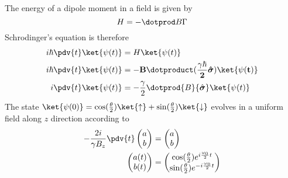 \documentclass[12pt]{article}
\begin{document}
        \section{}
        \subsection{} The energy of a dipole moment in a field is given by \[
            H = - \dotprod B \Gamma 
        \]
        Schrodinger's equation is therefore \begin{align*}
            i\hbar\pdv{t} \ket{\psi(t)} &= H \ket{\psi(t)}\\
            i\hbar\pdv{t} \ket{\psi(t)} &= - \bf B \dotproduct (\frac{\gamma\hbar}{2} \hat{\boldsymbol \sigma}) \ket{\psi(t)}\\
            i\pdv{t} \ket{\psi(t)} &= - \frac{\gamma}{2} \dotprod{B}{\hat{\boldsymbol \sigma}}\ket{\psi(t)}
        \end{align*}
        The state \(\ket{\psi(0)} = \cos(\frac{\theta}{2})\ket{\uparrow} + \sin(\frac{\theta}{2})\ket{\downarrow} \) evolves in a uniform field along \(z\) direction according to \begin{align*}
            - \frac{2i}{\gamma B_z} \pdv{t} \begin{pmatrix} a\\b \end{pmatrix}  &= \begin{pmatrix} a\\b \end{pmatrix} \\ 
            \begin{pmatrix} a(t)\\b(t) \end{pmatrix} &= \begin{pmatrix} \cos(\frac{\theta}{2})e^{i\frac{\omega_0}{2} t} \\ \sin(\frac{\theta}{2}) e^{ -i\frac{\omega_0}{2} t}\end{pmatrix}   
        \end{align*}
\end{document}
